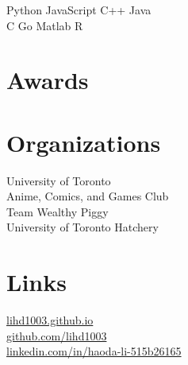 \documentclass[letterpaper]{deedy-resume} %
\begin{document}
\begin{minipage}[t]{0.33\textwidth}
Python \textbullet{} JavaScript \textbullet{} C++ \textbullet{} Java \\ 
C \textbullet{}Go\textbullet{} Matlab \textbullet{} R\\

\sectionspace %

\section{Awards} 
\subsectionspace
{}
\subsectionspace
{}
\sectionspace %


\section{Organizations} 


University of Toronto\\
Anime, Comics, and Games Club\\
\subsectionspace
{} 
Team Wealthy Piggy\\
University of Toronto Hatchery



\sectionspace %


\section{Links} 
\href{https://lihd1003.github.io/}{lihd1003.github.io}\\
\href{https://github.com/lihd1003}{github.com/lihd1003} \\
\href{https://www.linkedin.com/in/haoda-li-515b26165/}{linkedin.com/in/haoda-li-515b26165} \\


\end{minipage} %
\end{document}
